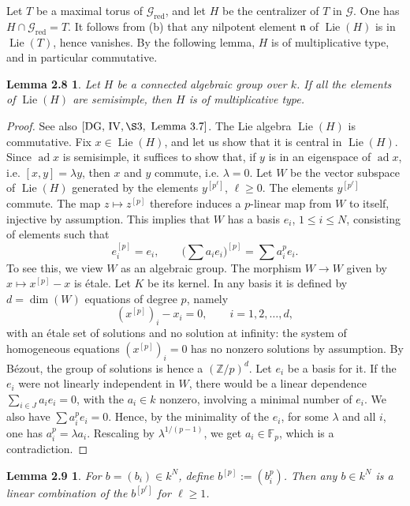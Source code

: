 \documentclass[11pt]{article}
\newcommand{\Lie}{\operatorname{Lie}}
\newcommand{\red}{\mathrm{red}}
\newtheorem*{lemma28}{Lemma 2.8}
\newtheorem*{lemma29}{Lemma 2.9}
\begin{document}
Let \(T\) be a maximal torus of \(\mathcal G_{\red}\), and let \(H\) be the centralizer
of \(T\) in \(\mathcal G\). One has \(H\cap \mathcal G_{\red}=T\). It follows from (b)
that any nilpotent element \(\mathfrak n\) of \(\Lie(H)\) is in \(\Lie(T)\), hence
vanishes. By the following lemma, \(H\) is of multiplicative type, and in particular
commutative.

\begin{lemma28}
Let \(H\) be a connected algebraic group over \(k\). If all the elements of \(\Lie(H)\)
are semisimple, then \(H\) is of multiplicative type.
\end{lemma28}

\begin{proof}
See also \([\mathrm{DG},\,\mathrm{IV},\S3,\text{ Lemma }3.7]\). The Lie algebra
\(\Lie(H)\) is commutative. Fix \(x\in \Lie(H)\), and let us show that it is central in
\(\Lie(H)\). Since \(\operatorname{ad}x\) is semisimple, it suffices to show that, if
\(y\) is in an eigenspace of \(\operatorname{ad}x\), i.e. \([x,y]=\lambda y\), then \(x\) and
\(y\) commute, i.e. \(\lambda=0\). Let \(W\) be the vector subspace of \(\Lie(H)\)
generated by the elements \(y^{[p^\ell]}\), \(\ell\ge0\). The elements
\(y^{[p^\ell]}\) commute. The map \(z\mapsto z^{[p]}\) therefore induces a \(p\)-linear
map from \(W\) to itself, injective by assumption. This implies that \(W\) has a basis
\(e_i\), \(1\le i\le N\), consisting of elements such that
\[
  e_i^{[p]}=e_i,
  \qquad
  \Big(\sum a_i e_i\Big)^{[p]}=\sum a_i^p e_i.
\]
To see this, we view \(W\) as an algebraic group. The morphism \(W\to W\) given by
\(x\mapsto x^{[p]}-x\) is étale. Let \(K\) be its kernel. In any basis it is defined
by \(d=\dim(W)\) equations of degree \(p\), namely
\[
  (x^{[p]})_i-x_i=0,\qquad i=1,2,\ldots,d,
\]
with an étale set of solutions and no solution at infinity: the system of homogeneous
equations \((x^{[p]})_i=0\) has no nonzero solutions by assumption. By Bézout, the
group of solutions is hence a \((\mathbb Z/p)^d\). Let \(e_i\) be a basis for it. If the
\(e_i\) were not linearly independent in \(W\), there would be a linear dependence
\(\sum_{i\in J} a_i e_i=0\), with the \(a_i\in k\) nonzero, involving a minimal number
of \(e_i\). We also have \(\sum a_i^p e_i=0\). Hence, by the minimality of the \(e_i\),
for some \(\lambda\) and all \(i\), one has \(a_i^p=\lambda a_i\). Rescaling by
\(\lambda^{1/(p-1)}\), we get \(a_i\in\mathbb F_p\), which is a contradiction.
\end{proof}

\begin{lemma29}
For \(b=(b_i)\in k^N\), define \(b^{[p]}:=(b_i^p)\). Then any \(b\in k^N\) is a
linear combination of the \(b^{[p^\ell]}\) for \(\ell\ge1\).
\end{lemma29}
\end{document}
